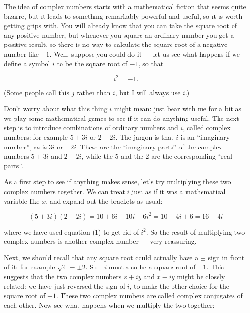   The idea of complex numbers starts with a mathematical fiction that seems 
  quite bizarre, but it leads to something remarkably powerful and useful, so 
  it is worth getting grips with. You will already know that you can take the 
  square root of any positive number, but whenever you square an ordinary 
  number you get a positive result, so there is no way to calculate the square 
  root of a negative number like $-1$. Well, suppose you could do it --- let us 
  see what happens if we define a symbol $i$ to be the square root of $-1$, so 
  that 

  \begin{equation*}i^2=-1 . \tag{1}\end{equation*} 

  (Some people call this $j$ rather than $i$, but I will always use $i$.) 

  Don't worry about what this thing $i$ might mean: just bear with me for a bit 
  as we play some mathematical games to see if it can do anything useful. The 
  next step is to introduce combinations of ordinary numbers and $i$, called 
  complex numbers: for example $5+3i$ or $2-2i$. The jargon is that $i$ is an 
  ``imaginary number'', as is $3i$ or $-2i$. These are the ``imaginary parts'' 
  of the complex numbers $5+3i$ and $2-2i$, while the $5$ and the $2$ are the 
  corresponding ``real parts''. 

  As a first step to see if anything makes sense, let's try multiplying these 
  two complex numbers together. We can treat $i$ just as if it was a 
  mathematical variable like $x$, and expand out the brackets as usual: 

  \begin{equation*}(5+3i)(2-2i) = 10 +6i -10i -6 i^2=10 -4i +6 = 16-4i 
  \tag{2}\end{equation*} 

  \noindent{}where we have used equation (1) to get rid of $i^2$. So the result 
  of multiplying two complex numbers is another complex number --- very 
  reassuring. 

  Next, we should recall that any square root could actually have a $\pm$ sign 
  in front of it: for example $\sqrt{4}=\pm2$. So $-i$ must also be a square 
  root of $-1$. This suggests that the two complex numbers $x+iy$ and $x-iy$ 
  might be closely related: we have just reversed the sign of $i$, to make the 
  other choice for the square root of $-1$. These two complex numbers are 
  called complex conjugates of each other. Now see what happens when we 
  multiply the two together: 

